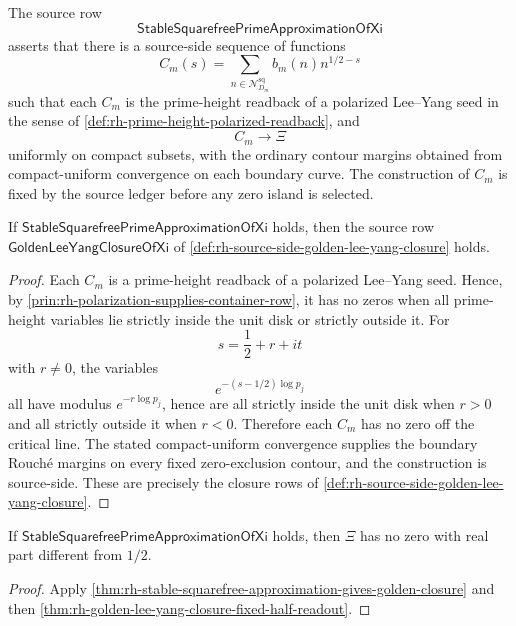 \begin{definition}
\label{def:rh-stable-squarefree-prime-approximation-xi}
The source row
$$
\mathsf{StableSquarefreePrimeApproximationOfXi}
$$
asserts that there is a source-side sequence of functions
$$
C_m(s)
=
\sum_{n\in\mathcal N_{D_m}^{\mathrm{sq}}}
b_m(n)n^{1/2-s}
$$
such that each $C_m$ is the prime-height readback of a polarized
Lee--Yang seed in the sense of
\autoref{def:rh-prime-height-polarized-readback}, and
$$
C_m\to \Xi
$$
uniformly on compact subsets, with the ordinary contour margins obtained
from compact-uniform convergence on each boundary curve.  The
construction of $C_m$ is fixed by the source ledger before any zero
island is selected.
\end{definition}

\begin{theorem}
\label{thm:rh-stable-squarefree-approximation-gives-golden-closure}
If $\mathsf{StableSquarefreePrimeApproximationOfXi}$ holds, then the
source row $\mathsf{GoldenLeeYangClosureOfXi}$ of
\autoref{def:rh-source-side-golden-lee-yang-closure} holds.
\end{theorem}

\begin{proof}
Each $C_m$ is a prime-height readback of a polarized Lee--Yang seed.
Hence, by \autoref{prin:rh-polarization-supplies-container-row}, it has
no zeros when all prime-height variables lie strictly inside the unit
disk or strictly outside it.  For
$$
s=\frac12+r+it
$$
with $r\ne0$, the variables
$$
e^{-(s-1/2)\log p_j}
$$
all have modulus $e^{-r\log p_j}$, hence are all strictly inside the
unit disk when $r>0$ and all strictly outside it when $r<0$.  Therefore
each $C_m$ has no zero off the critical line.  The stated
compact-uniform convergence supplies the boundary Rouch\'e margins on
every fixed zero-exclusion contour, and the construction is source-side.
These are precisely the closure rows of
\autoref{def:rh-source-side-golden-lee-yang-closure}.
\end{proof}

\begin{corollary}
\label{cor:rh-stable-squarefree-approximation-fixed-half}
If $\mathsf{StableSquarefreePrimeApproximationOfXi}$ holds, then $\Xi$
has no zero with real part different from $1/2$.
\end{corollary}

\begin{proof}
Apply
\autoref{thm:rh-stable-squarefree-approximation-gives-golden-closure}
and then
\autoref{thm:rh-golden-lee-yang-closure-fixed-half-readout}.
\end{proof}

